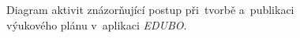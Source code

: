 \documentclass[male,czech,api_bc]{kitheses}
\begin{document}
\begin{figure}[H]
	\hspace*{1.84cm}
	\caption{Diagram aktivit znázorňující postup při~tvorbě a~publikaci výukového plánu v~aplikaci \textit{EDUBO}.}
	\label{fig:activity-diagram}
\end{figure}
\end{document}
